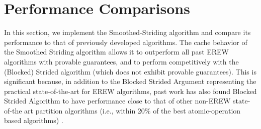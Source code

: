 \documentclass[11pt]{article}
\theoremstyle{remark}
\theoremstyle{remark}
\begin{document}



\section{Performance Comparisons}\label{secexp}

In this section, we implement the Smoothed-Striding algorithm and
compare its performance to that of previously developed
algorithms. The cache behavior of the Smoothed Striding algorithm
allows it to outperform all past EREW algorithms with provable
guarantees, and to perform competitively with the (Blocked) Strided
algorithm (which does not exhibit provable guarantees). This is
significant because, in addition to the Blocked Strided Argument
representing the practical state-of-the-art for EREW algorithms, past
work has also found Blocked Strided Algorithm to have performance
close to that of other non-EREW state-of-the art partition algorithms
(i.e., within 20\% of the best atomic-operation based algorithms)
\cite{Frias08}.
\end{document}
